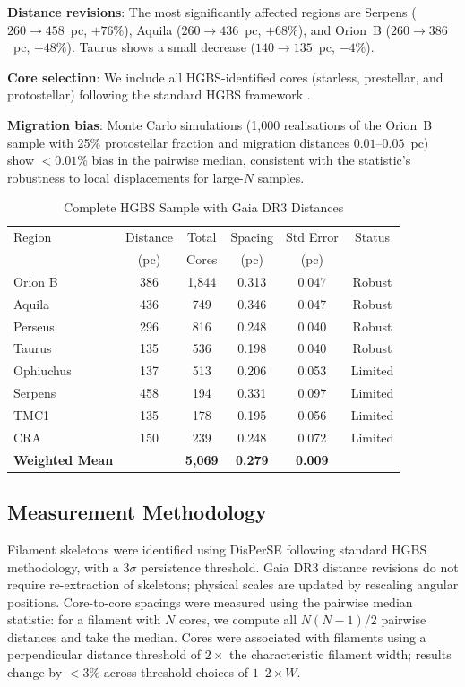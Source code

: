 \documentclass[twoside,twocolumn]{mnras}
\begin{document}
\textbf{Distance revisions}: The most significantly affected regions are Serpens
($260 \to 458$~pc, $+76\%$), Aquila ($260 \to 436$~pc, $+68\%$), and Orion~B
($260 \to 386$~pc, $+48\%$). Taurus shows a small decrease ($140 \to 135$~pc, $-4\%$).

\textbf{Core selection}: We include all HGBS-identified cores (starless, prestellar, and
protostellar) following the standard HGBS framework \citep{Konyves2015, Konyves2020}.

\textbf{Migration bias}: Monte Carlo simulations (1,000 realisations of the Orion~B sample
with 25\% protostellar fraction and migration distances $0.01$--$0.05$~pc) show $<0.01\%$
bias in the pairwise median, consistent with the statistic's robustness to local
displacements for large-$N$ samples.

\begin{table}
\caption{Complete HGBS Sample with Gaia DR3 Distances}
\label{tab:sample}
\begin{tabular}{lccccc}
\toprule
Region & Distance & Total & Spacing & Std Error & Status \\
       & (pc)   & Cores & (pc)   & (pc)      &  \\
\midrule
Orion B  & 386 & 1,844 & 0.313 & 0.047 & Robust \\
Aquila   & 436 & 749   & 0.346 & 0.047 & Robust \\
Perseus  & 296 & 816   & 0.248 & 0.040 & Robust \\
Taurus   & 135 & 536   & 0.198 & 0.040 & Robust \\
Ophiuchus& 137 & 513   & 0.206 & 0.053 & Limited \\
Serpens  & 458 & 194   & 0.331 & 0.097 & Limited \\
TMC1     & 135 & 178   & 0.195 & 0.056 & Limited \\
CRA      & 150 & 239   & 0.248 & 0.072 & Limited \\
\midrule
\textbf{Weighted Mean} &  & \textbf{5,069} & \textbf{0.279} & \textbf{0.009} &  \\
\bottomrule
\end{tabular}
\end{table}

\subsection{Measurement Methodology}

Filament skeletons were identified using DisPerSE \citep{Sousbie2011} following standard
HGBS methodology, with a $3\sigma$ persistence threshold. Gaia DR3 distance revisions
do not require re-extraction of skeletons; physical scales are updated by rescaling
angular positions. Core-to-core spacings were measured using the pairwise median
statistic: for a filament with $N$ cores, we compute all $N(N-1)/2$ pairwise distances
and take the median. Cores were associated with filaments using a perpendicular
distance threshold of $2\times$ the characteristic filament width; results change
by $<3\%$ across threshold choices of $1$--$2\times W$.
\end{document}
